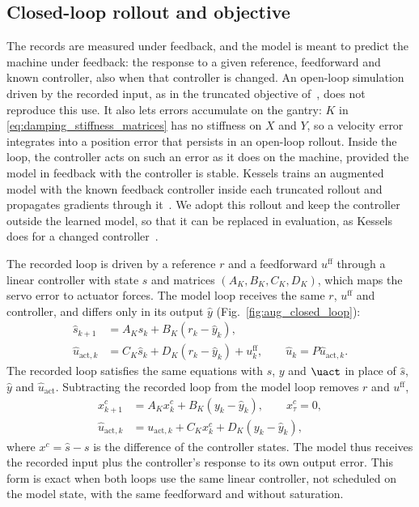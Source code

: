 \subsection{Closed-loop rollout and objective}\label{sec:aug_closed_loop}
The records are measured under feedback, and the model is meant to predict
the machine under feedback: the response to a given reference, feedforward
and known controller, also when that controller is changed.
An open-loop simulation driven by the recorded input, as in the truncated
objective of~\cite[Eq.~(22)]{hoekstra2026lfr}, does not reproduce this use.
It also lets errors accumulate on the gantry: $K$ in
\eqref{eq:damping_stiffness_matrices} has no stiffness on $X$ and $Y$, so a
velocity error integrates into a position error that persists in an
open-loop rollout.
Inside the loop, the controller acts on such an error as it does on the
machine, provided the model in feedback with the controller is stable.
Kessels trains an augmented model with the known feedback controller inside
each truncated rollout and propagates gradients through
it~\cite[Eqs.~(5.12), (5.13c), (5.13d)]{kessels2025ai}.
We adopt this rollout and keep the controller outside the learned model, so
that it can be replaced in evaluation, as Kessels does for a changed
controller~\cite[Sec.~5.3.2.3]{kessels2025ai}.

The recorded loop is driven by a reference $r$ and a feedforward
$u^{\mathrm{ff}}$ through a linear controller with state $s$ and matrices
$(A_K,B_K,C_K,D_K)$, which maps the servo error to actuator forces.
The model loop receives the same $r$, $u^{\mathrm{ff}}$ and controller, and
differs only in its output $\hat y$ (Fig.~\ref{fig:aug_closed_loop}):
\begin{equation}
\begin{aligned}
 \hat s_{k+1}&=A_K \hat s_k+B_K(r_k-\hat y_k),\\
 \hat u_{\mathrm{act},k}&=C_K \hat s_k+D_K(r_k-\hat y_k)+u^{\mathrm{ff}}_k,
 \qquad \hat u_k=P\hat u_{\mathrm{act},k}.
\end{aligned}
\label{eq:aug_direct_controller}
\end{equation}
The recorded loop satisfies the same equations with $s$, $y$ and $\uact$ in
place of $\hat s$, $\hat y$ and $\hat u_{\mathrm{act}}$.
Subtracting the recorded loop from the model loop removes $r$ and
$u^{\mathrm{ff}}$,
\begin{equation}
\begin{aligned}
 x^c_{k+1}&=A_K x^c_k+B_K(y_k-\hat y_k),\qquad x^c_\tau=0,\\
 \hat u_{\mathrm{act},k}&=u_{\mathrm{act},k}+C_K x^c_k+D_K(y_k-\hat y_k),
\end{aligned}
\label{eq:aug_controller}
\end{equation}
where $x^c=\hat s-s$ is the difference of the controller states.
The model thus receives the recorded input plus the controller's response to
its own output error.
This form is exact when both loops use the same linear controller, not
scheduled on the model state, with the same feedforward and without
saturation.

